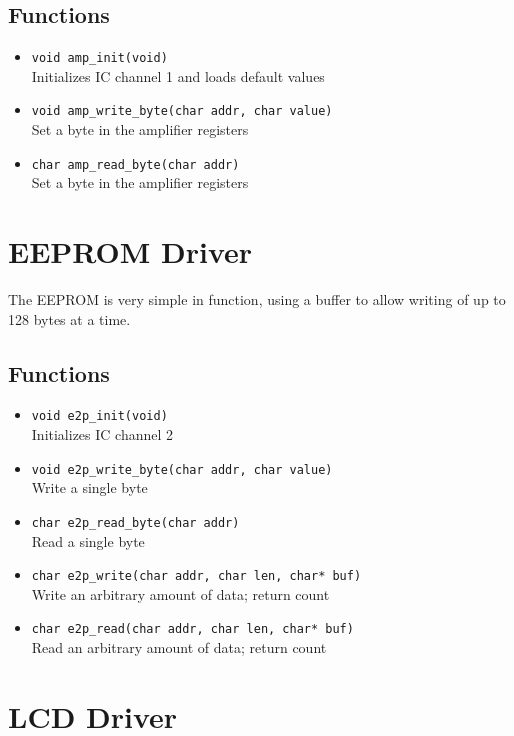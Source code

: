 \subsection*{Functions}
\begin{itemize}
\item \texttt{void amp\_init(void)} \\ Initializes IC channel 1 and loads default values
\item \texttt{void amp\_write\_byte(char addr, char value)} \\ Set a byte in the amplifier registers
\item \texttt{char amp\_read\_byte(char addr)} \\ Set a byte in the amplifier registers
\end{itemize}

\section{EEPROM Driver}
The EEPROM is very simple in function, using a buffer to allow writing of up to 128 bytes at a time.
\subsection*{Functions}
\begin{itemize}
\item \texttt{void e2p\_init(void)} \\ Initializes IC channel 2
\item \texttt{void e2p\_write\_byte(char addr, char value)} \\ Write a single byte
\item \texttt{char e2p\_read\_byte(char addr)} \\ Read a single byte
\item \texttt{char e2p\_write(char addr, char len, char* buf)} \\ Write an arbitrary amount of data; return count
\item \texttt{char e2p\_read(char addr, char len, char* buf)} \\ Read an arbitrary amount of data; return count
\end{itemize}

\section{LCD Driver}

